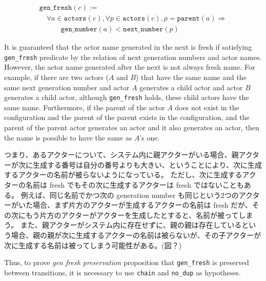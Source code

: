 \begin{displaymath}
  \begin{array}{l}
    \texttt{gen\_fresh}(c) := \\
    \quad \forall a \in \texttt{actors}(c), \forall p \in \texttt{actors}(c), p = \texttt{parent}(a) \Rightarrow \\
    \quad \quad \quad \texttt{gen\_number}(a) < \texttt{next\_number}(p)
  \end{array}
\end{displaymath}


It is guaranteed that the actor name generated in the next is fresh if satisfying \texttt{gen\_fresh} predicate by the relation of next generation numbers and actor names. %
However, the actor name generated after the next is not always fresh name.
For example, if there are two actors ($A$ and $B$) that have the same name and the same next generation number and actor $A$ generates a child actor and actor $B$ generates a child actor, although \texttt{gen\_fresh} holds, these child actors have the same name.
Furthermore, if the parent of the actor $A$ does not exist in the configuration and the parent of the parent exists in the configuration, and the parent of the parent actor generates an actor and it also generates an actor, then the name is possible to have the same as $A$'s one.

つまり、あるアクターについて、システム内に親アクターがいる場合、親アクターが次に生成する番号は自分の番号よりも大きい、ということにより、次に生成するアクターの名前が被らないようになっている。
ただし、次に生成するアクターの名前は fresh でもその次に生成するアクターは fresh ではないこともある。
例えば、同じ名前でかつ次の generation number も同じという2つのアクターがいた場合、まず片方のアクターが生成するアクターの名前は fresh だが、その次にもう片方のアクターがアクターを生成したとすると、名前が被ってしまう。
また、親アクターがシステム内に存在せずに、親の親は存在しているという場合、親の親が次に生成するアクターの名前は被らないが、その子アクターが次に生成する名前は被ってしまう可能性がある。(図？)

Thus, to prove \textit{gen fresh preservation} proposition that \texttt{gen\_fresh} is preserved between transitions, it is necessary to use \texttt{chain} and \texttt{no\_dup} as hypotheses.

